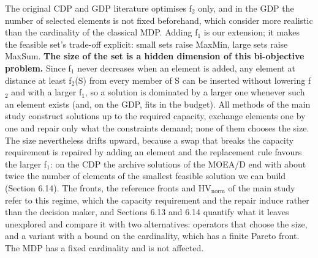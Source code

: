 The original CDP and GDP literature optimises f$_{2}$ only, and in the GDP the number of selected elements is not fixed beforehand, which \citet{martinezgavara2021} consider more realistic than the cardinality of the classical MDP. Adding f$_{1}$ is our extension; it makes the feasible set's trade-off explicit: small sets raise MaxMin, large sets raise MaxSum. \textbf{The size of the set is a hidden dimension of this bi-objective problem.} Since f$_{1}$ never decreases when an element is added, any element at distance at least f$_{2}$(S) from every member of S can be inserted without lowering f$_{2}$ and with a larger f$_{1}$, so a solution is dominated by a larger one whenever such an element exists (and, on the GDP, fits in the budget). All methods of the main study construct solutions up to the required capacity, exchange elements one by one and repair only what the constraints demand; none of them chooses the size. The size nevertheless drifts upward, because a swap that breaks the capacity requirement is repaired by adding an element and the replacement rule favours the larger f$_{1}$: on the CDP the archive solutions of the MOEA/D end with about twice the number of elements of the smallest feasible solution we can build (Section 6.14). The fronts, the reference fronts and $\mathrm{HV}_{\mathrm{norm}}$ of the main study refer to this regime, which the capacity requirement and the repair induce rather than the decision maker, and Sections 6.13 and 6.14 quantify what it leaves unexplored and compare it with two alternatives: operators that choose the size, and a variant with a bound on the cardinality, which has a finite Pareto front. The MDP has a fixed cardinality and is not affected.
